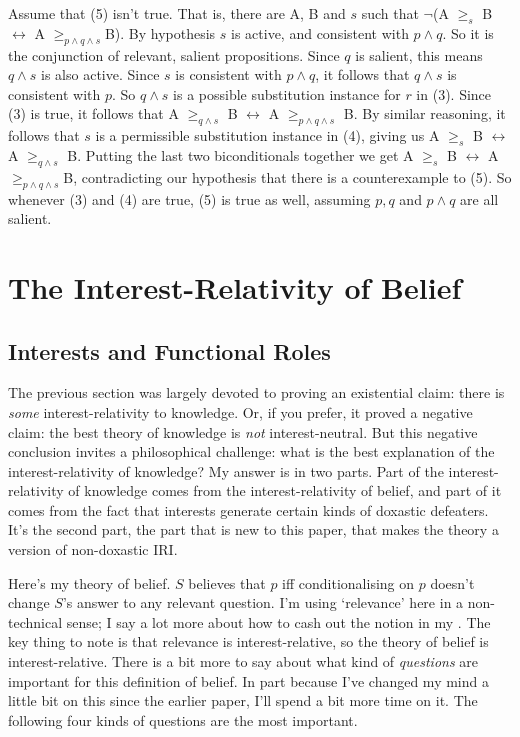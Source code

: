 \noindent Assume that (5) isn't true. That is, there are A, B and \(s\) such that \(\neg\)(A \(\geq_s\) B \(\leftrightarrow\) A \(\geq _{p \wedge q \wedge s}\)B). By hypothesis \(s\) is active, and consistent with \(p \wedge q\). So it is the conjunction of relevant, salient propositions. Since \(q\) is salient, this means \(q \wedge s\) is also active. Since \(s\) is consistent with \(p \wedge q\), it follows that \(q \wedge s\) is consistent with \(p\). So \(q \wedge s\) is a possible substitution instance for \(r\) in (3). Since (3) is true, it follows that A \(\geq _{q \wedge s}\) B \(\leftrightarrow\) A \(\geq _{p \wedge q \wedge s}\) B. By similar reasoning, it follows that \(s\) is a permissible substitution instance in (4), giving us A \(\geq_s\) B \(\leftrightarrow\) A \(\geq _{q \wedge s}\) B. Putting the last two biconditionals together we get A \(\geq_s\) B \(\leftrightarrow\) A \(\geq _{p \wedge q \wedge s}\)B, contradicting our hypothesis that there is a counterexample to (5). So whenever (3) and (4) are true, (5) is true as well, assuming \(p, q\) and \(p \wedge q\) are all salient.


\section{The Interest-Relativity of Belief}

\subsection{Interests and Functional Roles}
The previous section was largely devoted to proving an existential claim: there is \textit{some} interest-relativity to knowledge. Or, if you prefer, it proved a negative claim: the best theory of knowledge is \textit{not} interest-neutral. But this negative conclusion invites a philosophical challenge: what is the best explanation of the interest-relativity of knowledge? My answer is in two parts. Part of the interest-relativity of knowledge comes from the interest-relativity of belief, and part of it comes from the fact that interests generate certain kinds of doxastic defeaters. It's the second part, the part that is new to this paper, that makes the theory a version of non-doxastic IRI.

Here's my theory of belief. $S$ believes that $p$ iff conditionalising on $p$ doesn't change $S$'s answer to any relevant question. I'm using `relevance' here in a non-technical sense; I say a lot more about how to cash out the notion in my \citeyearpar{Weatherson2005-WEACWD}. The key thing to note is that relevance is interest-relative, so the theory of belief is interest-relative. There is a bit more to say about what kind of \textit{questions} are important for this definition of belief. In part because I've changed my mind a little bit on this since the earlier paper, I'll spend a bit more time on it. The following four kinds of questions are the most important.

